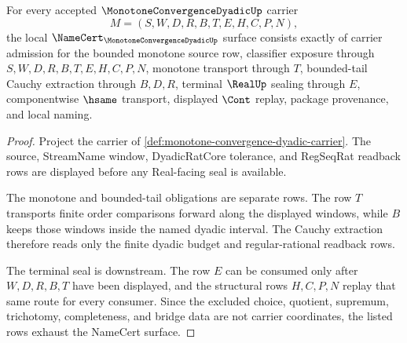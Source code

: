 \begin{theorem}
\label{thm:monotone-convergence-dyadic-obligation-surface}
For every accepted $\MonotoneConvergenceDyadicUp$ carrier
$$
M=(S,W,D,R,B,T,E,H,C,P,N),
$$
the local $\NameCert_{\MonotoneConvergenceDyadicUp}$ surface consists exactly of carrier admission for the bounded monotone source row, classifier exposure through $S,W,D,R,B,T,E,H,C,P,N$, monotone transport through $T$, bounded-tail Cauchy extraction through $B,D,R$, terminal $\RealUp$ sealing through $E$, componentwise $\hsame$ transport, displayed $\Cont$ replay, package provenance, and local naming.
\end{theorem}
\begin{proof}
Project the carrier of \autoref{def:monotone-convergence-dyadic-carrier}. The source, StreamName window, DyadicRatCore tolerance, and RegSeqRat readback rows are displayed before any Real-facing seal is available.

The monotone and bounded-tail obligations are separate rows. The row $T$ transports finite order comparisons forward along the displayed windows, while $B$ keeps those windows inside the named dyadic interval. The Cauchy extraction therefore reads only the finite dyadic budget and regular-rational readback rows.

The terminal seal is downstream. The row $E$ can be consumed only after $W,D,R,B,T$ have been displayed, and the structural rows $H,C,P,N$ replay that same route for every consumer. Since the excluded choice, quotient, supremum, trichotomy, completeness, and bridge data are not carrier coordinates, the listed rows exhaust the NameCert surface.
\end{proof}


